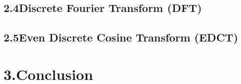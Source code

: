\documentclass[12pt]{article}
\begin{document}
\subsection*{2.4\quad Discrete Fourier Transform (DFT)}


\subsection*{2.5\quad Even Discrete Cosine Transform (EDCT)}




\section*{3.\quad Conclusion}
\end{document}
